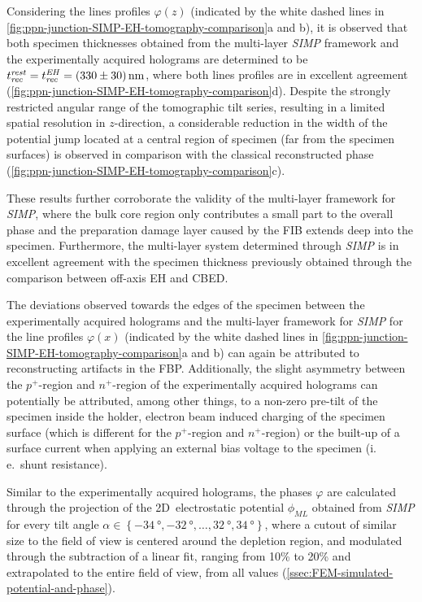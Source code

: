 Considering the lines profiles $\varphi\left(z\right)$ (indicated by the white dashed lines in \cref{fig:ppn-junction-SIMP-EH-tomography-comparison}a and b), it is observed that both specimen thicknesses obtained from the multi-layer \emph{SIMP} framework and the experimentally acquired holograms are determined to be $t_{\mathit{rec}}^{\mathit{rest}} = t_{\mathit{rec}}^{\mathit{EH}} = \SI{330 \pm 30}{\nm}$, where both lines profiles are in excellent agreement (\cref{fig:ppn-junction-SIMP-EH-tomography-comparison}d). Despite the strongly restricted angular range of the tomographic tilt series, resulting in a limited spatial resolution in $z$-direction, a considerable reduction in the width of the potential jump located at a central region of specimen (far from the specimen surfaces) is observed in comparison with the classical reconstructed phase (\cref{fig:ppn-junction-SIMP-EH-tomography-comparison}c).

These results further corroborate the validity of the multi-layer framework for \emph{SIMP}, where the bulk core region only contributes a small part to the overall phase and the preparation damage layer caused by the FIB extends deep into the specimen. Furthermore, the multi-layer system determined through \emph{SIMP} is in excellent agreement with the specimen thickness previously obtained through the comparison between off-axis EH and CBED.

The deviations observed towards the edges of the specimen between the experimentally acquired holograms and the multi-layer framework for \emph{SIMP} for the line profiles $\varphi\left(x\right)$ (indicated by the white dashed lines in \cref{fig:ppn-junction-SIMP-EH-tomography-comparison}a and b) can again be attributed to reconstructing artifacts in the FBP. Additionally, the slight asymmetry between the $p^+$-region and $n^+$-region of the experimentally acquired holograms can potentially be attributed, among other things, to a non-zero pre-tilt of the specimen inside the holder, electron beam induced charging of the specimen surface (which is different for the $p^+$-region and $n^+$-region) or the built-up of a surface current when applying an external bias voltage to the specimen (i.\,e.\ shunt resistance).

Similar to the experimentally acquired holograms, the phases $\varphi$ are calculated through the projection of the 2D~electrostatic potential $\phi_{\mathit{ML}}$ obtained from \emph{SIMP} for every tilt angle $\alpha \in \left\{\SI{-34}{\degree}, \SI{-32}{\degree}, \dots , \SI{+32}{\degree}, \SI{+34}{\degree}\right\}$, where a cutout of similar size to the field of view is centered around the depletion region, and modulated through the subtraction of a linear fit, ranging from 10\% to 20\% and extrapolated to the entire field of view, from all values (\cref{ssec:FEM-simulated-potential-and-phase}).

